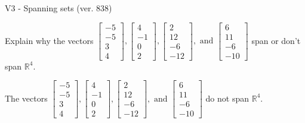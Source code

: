\begin{exercise}
  \begin{exerciseTitle}V3 - Spanning sets (ver. 838)\end{exerciseTitle}
  \begin{exerciseStatement}
    Explain why the vectors \(\left[\begin{array}{r}
-5 \\
-5 \\
3 \\
4
\end{array}\right] , \left[\begin{array}{r}
4 \\
-1 \\
0 \\
2
\end{array}\right] , \left[\begin{array}{r}
2 \\
12 \\
-6 \\
-12
\end{array}\right] , \text{ and } \left[\begin{array}{r}
6 \\
11 \\
-6 \\
-10
\end{array}\right]\) span or don't span \(\mathbb{R}^4\). 
	


  \end{exerciseStatement}
  \begin{exerciseAnswer}
   The vectors \(\left[\begin{array}{r}
-5 \\
-5 \\
3 \\
4
\end{array}\right] , \left[\begin{array}{r}
4 \\
-1 \\
0 \\
2
\end{array}\right] , \left[\begin{array}{r}
2 \\
12 \\
-6 \\
-12
\end{array}\right] , \text{ and } \left[\begin{array}{r}
6 \\
11 \\
-6 \\
-10
\end{array}\right]\) 
  	 do not  
	span \(\mathbb{R}^4\).
  


  \end{exerciseAnswer}
\end{exercise}